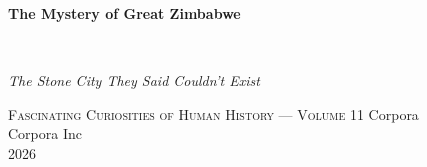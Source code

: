 \clearpage
\vspace*{1.5in}
\begin{center}
  \begin{minipage}{\textwidth}
    \centering
    \Huge\bfseries
    \linespread{1.25}\selectfont
    The Mystery of Great Zimbabwe
  \end{minipage}
  \\[3em]
  {\Large\itshape\linespread{1.3}\selectfont
  The Stone City They Said Couldn't Exist\par}
  \vspace{2em}
  {\small\scshape Fascinating Curiosities of Human History — Volume 11}
  \vfill
  {\large Corpora}
  \\[1em]
  {\large Corpora Inc}
  \\[1em]
  {\large 2026}
\end{center}
\clearpage
